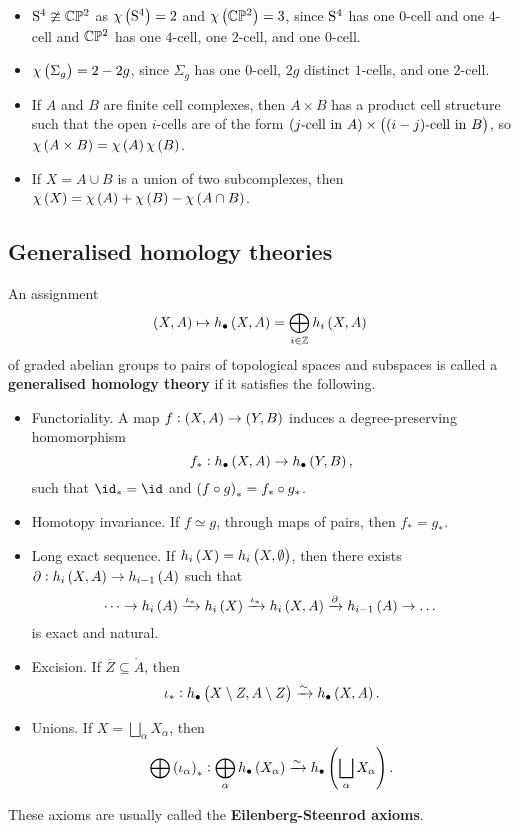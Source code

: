 \begin{example*}
\hfill
\begin{itemize}
\item $ \S^4 \ncong \CC\PP^2 $ as $ \chi\br{\S^4} = 2 $ and $ \chi\br{\CC\PP^2} = 3 $, since $ \S^4 $ has one $ 0 $-cell and one $ 4 $-cell and $ \CC\PP^2 $ has one $ 4 $-cell, one $ 2 $-cell, and one $ 0 $-cell.
\item $ \chi\br{\Sigma_g} = 2 - 2g $, since $ \Sigma_g $ has one $ 0 $-cell, $ 2g $ distinct $ 1 $-cells, and one $ 2 $-cell.
\item If $ A $ and $ B $ are finite cell complexes, then $ A \times B $ has a product cell structure such that the open $ i $-cells are of the form $ \br{\text{$ j $-cell in} \ A} \times \br{\text{$ \br{i - j} $-cell in} \ B} $, so $ \chi\br{A \times B} = \chi\br{A}\chi\br{B} $.
\item If $ X = A \cup B $ is a union of two subcomplexes, then $ \chi\br{X} = \chi\br{A} + \chi\br{B} - \chi\br{A \cap B} $.
\end{itemize}
\end{example*}

\pagebreak

\subsection{Generalised homology theories}


\begin{definition*}
An assignment
$$ \br{X, A} \mapsto h_\bullet\br{X, A} = \bigoplus_{i \in \ZZ} h_i\br{X, A} $$
of graded abelian groups to pairs of topological spaces and subspaces is called a \textbf{generalised homology theory} if it satisfies the following.
\begin{itemize}
\item Functoriality. A map $ f : \br{X, A} \to \br{Y, B} $ induces a degree-preserving homomorphism
$$ f_* : h_\bullet\br{X, A} \to h_\bullet\br{Y, B}, $$
such that $ \id_* = \id $ and $ \br{f \circ g}_* = f_* \circ g_* $.
\item Homotopy invariance. If $ f \simeq g $, through maps of pairs, then $ f_* = g_* $.
\item Long exact sequence. If $ h_i\br{X} = h_i\br{X, \emptyset} $, then there exists $ \da : h_i\br{X, A} \to h_{i - 1}\br{A} $ such that
$$ \dots \to h_i\br{A} \xrightarrow{\iota_*} h_i\br{X} \xrightarrow{\iota_*} h_i\br{X, A} \xrightarrow{\da} h_{i - 1}\br{A} \to \dots $$
is exact and natural.
\item Excision. If $ \overline{Z} \subseteq \mathring{A} $, then
$$ \iota_* : h_\bullet\br{X \setminus Z, A \setminus Z} \xrightarrow{\sim} h_\bullet\br{X, A}. $$
\item Unions. If $ X = \bigsqcup_\alpha X_\alpha $, then
$$ \bigoplus \br{\iota_\alpha}_* : \bigoplus_\alpha h_\bullet\br{X_\alpha} \xrightarrow{\sim} h_\bullet\br{\bigsqcup_\alpha X_\alpha}. $$
\end{itemize}
These axioms are usually called the \textbf{Eilenberg-Steenrod axioms}.
\end{definition*}

